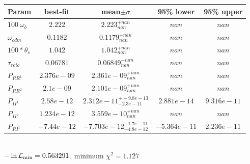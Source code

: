 \begin{tabular}{|l|c|c|c|c|} 
 \hline 
Param & best-fit & mean$\pm\sigma$ & 95\% lower & 95\% upper \\ \hline 
$100~\omega_{b }$ &$2.222$ & $2.223_{nan}^{+nan}$ & $nan$ & $nan$ \\ 
$\omega_{cdm }$ &$0.1182$ & $0.1179_{nan}^{+nan}$ & $nan$ & $nan$ \\ 
$100*\theta_{s }$ &$1.042$ & $1.042_{nan}^{+nan}$ & $nan$ & $nan$ \\ 
$\tau_{reio }$ &$0.06781$ & $0.06849_{nan}^{+nan}$ & $nan$ & $nan$ \\ 
$P_{{RR}^1 }$ &$2.376e-09$ & $2.361e-09_{nan}^{+nan}$ & $nan$ & $nan$ \\ 
$P_{{RR}^2 }$ &$2.1e-09$ & $2.101e-09_{nan}^{+nan}$ & $nan$ & $nan$ \\ 
$P_{{II}^1 }$ &$2.58e-12$ & $2.312e-11_{-2.3e-11}^{+-9.8e-13}$ & $2.881e-14$ & $9.316e-11$ \\ 
$P_{{II}^2 }$ &$1.234e-12$ & $3.559e-10_{nan}^{+nan}$ & $nan$ & $nan$ \\ 
$P_{{RI}^1 }$ &$-7.44e-12$ & $-7.703e-12_{-4.8e-12}^{+1.7e-11}$ & $-5.364e-11$ & $2.236e-11$ \\ 
\hline 
 \end{tabular} \\ 
$-\ln{\cal L}_\mathrm{min} =0.563291$, minimum $\chi^2=1.127$ \\ 
